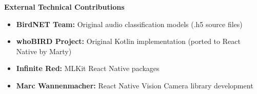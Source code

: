 \textbf{External Technical Contributions}
\begin{itemize}
    \item \textbf{BirdNET Team:} Original audio classification models (.h5 source files)
    \item \textbf{whoBIRD Project:} Original Kotlin implementation (ported to React Native by Marty)
    \item \textbf{Infinite Red:} MLKit React Native packages
    \item \textbf{Marc Wannenmacher:} React Native Vision Camera library development
\end{itemize}